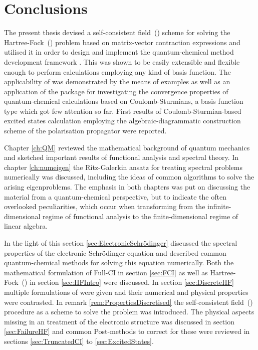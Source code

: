 \chapter{Conclusions}
\label{ch:Conclusion}

\noindent
The present thesis devised a self-consistent field~(\SCF)
scheme for solving the Hartree-Fock~(\HF) problem
based on matrix-vector contraction expressions
and utilised it in order to design and implement the
quantum-chemical method development framework \molsturm.
This was shown to be easily extensible and flexible enough
to perform calculations
employing any kind of basis function.
The applicability of \molsturm was demonstrated by the means
of examples as well as an application of the package for
investigating the convergence properties
of quantum-chemical calculations
based on Coulomb-Sturmians,
a basis function type which got few attention so far.
First results of Coulomb-Sturmian-based excited states
calculation employing the algebraic-diagrammatic construction scheme
of the polarisation propagator were reported.


Chapter \ref{ch:QM} reviewed the mathematical background of quantum mechanics
and sketched important results of functional analysis
and spectral theory.
In chapter \ref{ch:numeigen} the Ritz-Galerkin ansatz
for treating spectral problems numerically
was discussed, including the ideas of common algorithms
to solve the arising eigenproblems.
The emphasis in both chapters
was put on discussing the material from a quantum-chemical perspective,
but to indicate the often overlooked peculiarities,
which occur when transforming from the infinite-dimensional regime
of functional analysis to the finite-dimensional regime of linear algebra.


In the light of this section \ref{sec:ElectronicSchrödinger}
discussed the spectral properties
of the electronic Schrödinger equation and
described common quantum-chemical methods
for solving this equation numerically.
Both the mathematical formulation of Full-CI in section \ref{sec:FCI}
as well as Hartree-Fock~(\HF) in section \ref{sec:HFIntro} were discussed.
In section \ref{sec:DiscreteHF} multiple formulations of \HF were given
and their numerical and physical properties were contrasted.
In remark \ref{rem:PropertiesDiscretised}
the self-consistent field~(\SCF) procedure
as a scheme to solve the \HF problem was introduced.
The physical aspects missing in an \HF treatment of the electronic
structure was discussed in section \ref{sec:FailureHF}
and common Post-\HF methods to correct for these were
reviewed in sections \ref{sec:TruncatedCI} to \ref{sec:ExcitedStates}.

